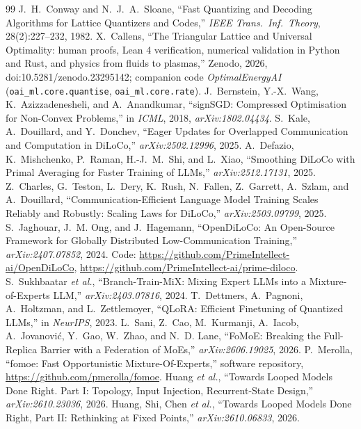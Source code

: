 \documentclass[11pt,a4paper]{article}
\begin{document}
\begin{thebibliography}{99}
 J.~H.~Conway and N.~J.~A.~Sloane, ``Fast Quantizing and Decoding Algorithms for Lattice Quantizers and Codes,'' \textit{IEEE Trans.\ Inf.\ Theory}, 28(2):227--232, 1982.
 X.~Callens, ``The Triangular Lattice and Universal Optimality: human proofs, Lean 4 verification, numerical validation in Python and Rust, and physics from fluids to plasmas,'' Zenodo, 2026, doi:10.5281/zenodo.23295142; companion code \textit{OptimalEnergyAI} (\texttt{oai\_ml.core.quantise}, \texttt{oai\_ml.core.rate}).
 J.~Bernstein, Y.-X.~Wang, K.~Azizzadenesheli, and A.~Anandkumar, ``signSGD: Compressed Optimisation for Non-Convex Problems,'' in \textit{ICML}, 2018, \textit{arXiv:1802.04434}.
 S.~Kale, A.~Douillard, and Y.~Donchev, ``Eager Updates for Overlapped Communication and Computation in DiLoCo,'' \textit{arXiv:2502.12996}, 2025.
 A.~Defazio, K.~Mishchenko, P.~Raman, H.-J.~M.~Shi, and L.~Xiao, ``Smoothing DiLoCo with Primal Averaging for Faster Training of LLMs,'' \textit{arXiv:2512.17131}, 2025.
 Z.~Charles, G.~Teston, L.~Dery, K.~Rush, N.~Fallen, Z.~Garrett, A.~Szlam, and A.~Douillard, ``Communication-Efficient Language Model Training Scales Reliably and Robustly: Scaling Laws for DiLoCo,'' \textit{arXiv:2503.09799}, 2025.
 S.~Jaghouar, J.~M. Ong, and J.~Hagemann, ``OpenDiLoCo: An Open-Source Framework for Globally Distributed Low-Communication Training,'' \textit{arXiv:2407.07852}, 2024. Code: \url{https://github.com/PrimeIntellect-ai/OpenDiLoCo}, \url{https://github.com/PrimeIntellect-ai/prime-diloco}.
 S.~Sukhbaatar \textit{et al.}, ``Branch-Train-MiX: Mixing Expert LLMs into a Mixture-of-Experts LLM,'' \textit{arXiv:2403.07816}, 2024.
 T.~Dettmers, A.~Pagnoni, A.~Holtzman, and L.~Zettlemoyer, ``QLoRA: Efficient Finetuning of Quantized LLMs,'' in \textit{NeurIPS}, 2023.
 L.~Sani, Z.~Cao, M.~Kurmanji, A.~Iacob, A.~Jovanovi\'c, Y.~Gao, W.~Zhao, and N.~D. Lane, ``FoMoE: Breaking the Full-Replica Barrier with a Federation of MoEs,'' \textit{arXiv:2606.19025}, 2026.
 P.~Merolla, ``fomoe: Fast Opportunistic Mixture-Of-Experts,'' software repository, \url{https://github.com/pmerolla/fomoe}.
 Huang \textit{et al.}, ``Towards Looped Models Done Right. Part I: Topology, Input Injection, Recurrent-State Design,'' \textit{arXiv:2610.23036}, 2026.
 Huang, Shi, Chen \textit{et al.}, ``Towards Looped Models Done Right, Part II: Rethinking at Fixed Points,'' \textit{arXiv:2610.06833}, 2026.

\end{thebibliography}
\end{document}
